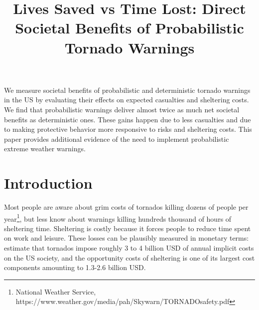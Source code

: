 \documentclass{ametsocV6.1}
\title{Lives Saved vs Time Lost: Direct Societal Benefits of Probabilistic Tornado Warnings}
\affiliation{\aff{a}{University of Oklahoma, CIMMS}}
\begin{document}
\maketitle

%
%
%
\statement
	We measure societal benefits of probabilistic and deterministic tornado warnings in the US by evaluating their effects on expected casualties and sheltering costs. We find that probabilistic warnings deliver almost twice as much net societal benefits as deterministic ones. These gains happen due to less casualties and due to making protective behavior more responsive to risks and sheltering costs.  This paper provides additional evidence of the need to implement probabilistic extreme weather warnings.
%
% 


%
\section{Introduction}

Most people are aware about grim costs of tornados killing dozens of people per year\footnote{National Weather Service, https://www.weather.gov/media/pah/Skywarn/TORNADOsafety.pdf}, but less know about warnings killing hundreds thousand of hours of sheltering time.  Sheltering is costly because it forces people to reduce time spent on work and leisure. These losses can be plausibly measured in monetary terms: \citet{simmons_economic_2013} estimate that tornados impose roughly 3 to 4 billion USD of annual implicit costs on the US society, and the opportunity costs of sheltering is one of its largest cost components amounting to 1.3-2.6 billion USD.
\end{document}
